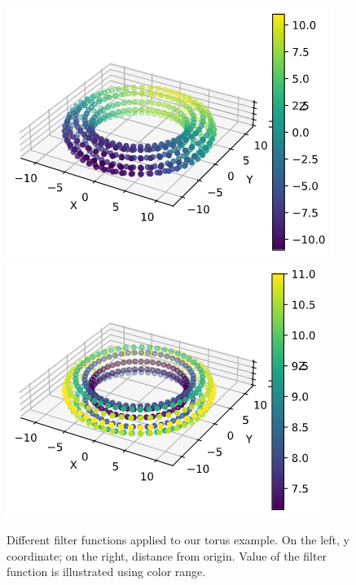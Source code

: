 \documentclass{article}
\begin{document}
\begin{figure}[ht]
    \centering
    \includegraphics[width=0.4\columnwidth]{torus-y-coor}
    \includegraphics[width=0.4\columnwidth]{torus-distance-from-origin}
    \caption{Different filter functions applied to our torus example.
        On the left, y coordinate; on the right, distance from origin.
        Value of the filter function is illustrated using color range.}
    \label{fig:torus-filter}
\end{figure}



\end{document}
